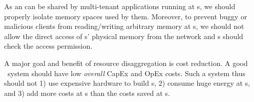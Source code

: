 As an \MN{} can be shared by multi-tenant applications running at \CN{}s, %
we should properly isolate memory spaces used by them.
Moreover, to prevent buggy or malicious clients from reading/writing arbitrary memory at \MN{}s, we should not allow the direct access of \MN{}s' physical memory from the network and \MN{}s should check the access permission.

A major goal and benefit of resource disaggregation is cost reduction.
A good \md\ system should have low {\em overall} CapEx and OpEx costs.
Such a system thus should not 1) use expensive hardware to build \MN{}s, 
2) consume huge energy at \MN{}s,
and 3) add more costs at \CN{}s than the costs saved at \MN{}s.


